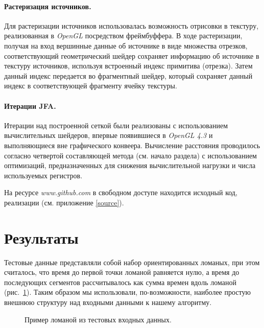 \documentclass[12pt]{article}
\begin{document}
\paragraph{Растеризация источников.} Для растеризации источников 
использовалась возможность отрисовки в текстуру, реализованная в \emph{OpenGL}
посредством фреймбуффера. В ходе растеризации, получая на вход вершинные данные об
источнике в виде множества отрезков, соответствующий геометрический шейдер 
сохраняет информацию об источнике в текстуру источников, используя встроенный 
индекс примитива (отрезка). Затем данный индекс передается во фрагментный шейдер,
который сохраняет данный индекс в соответствующей фрагменту ячейку текстуры.

\paragraph{Итерации JFA.} Итерации над построенной сеткой были
реализованы с использованием вычислительных шейдеров,
впервые появившиеся в \emph{OpenGL 4.3} и выполняющиеся вне
графического конвеера. Вычисление расстояния проводилось согласно 
четвертой составляющей метода (см. начало раздела) с использованием 
оптимизаций, предназначенных для снижения вычислительной нагрузки и 
числа используемых регистров.

На ресурсе \emph{www.github.com} в свободном доступе находится исходный код, 
реализации (см. приложение \ref{source}).

\section{Результаты}
Тестовые данные представляли собой набор ориентированных ломаных, при этом
считалось, что время до первой точки ломаной равняется нулю, а время до 
последующих сегментов рассчитывалось как сумма времен вдоль ломаной (рис.~\ref{fig_input}).
Таким образом мы использовали, по-возможности, наиболее простую внешнюю структуру
над входными данными к нашему алгоритму. 
\begin{figure}
\label{fig_input}
\begin{center}
\end{center}
\caption{Пример ломаной из тестовых входных данных.}
\end{figure}
\end{document}
